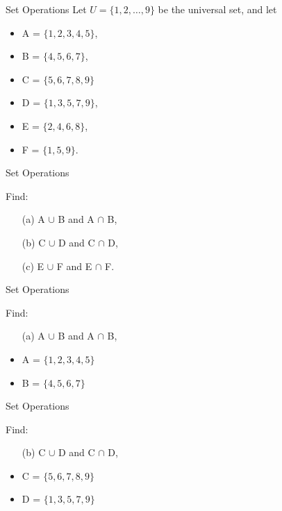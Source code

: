 \documentclass[11pt,a4paper,titlepage,oneside,openany]{article}
\numberwithin{equation}{section}
\numberwithin{algorithm}{section}
\numberwithin{figure}{section}
\numberwithin{table}{section}
\begin{document}
{%
\newpage



{Set Operations}
Let $U = \{1,2,\ldots, 9\}$ be the universal set, and let
\begin{itemize}
\item A = $\{1, 2, 3, 4, 5\}$,  
\item B = $\{4, 5, 6, 7\}$,  
\item C = $\{5, 6, 7, 8, 9\}$
\item D = $\{1, 3, 5, 7, 9\}$,
\item E = $\{2, 4, 6, 8\}$,
\item F = $\{1, 5, 9\}$.
\end{itemize}


{Set Operations}

Find: 
\begin{itemize}
\item[(a)] A $\cup$ B and A $\cap$ B, 
\item[(b)] C $\cup$ D and C $\cap$ D, 
\item[(c)] E $\cup$ F and E $\cap$ F.
\end{itemize}



{Set Operations}

Find: 
\begin{itemize}
\item[(a)] A $\cup$ B and A $\cap$ B, \bigskip
\item A = $\{1, 2, 3, 4, 5\}$  
\item B = $\{4, 5, 6, 7\}$  
\end{itemize}



{Set Operations}

Find: 
\begin{itemize}
\item[(b)] C $\cup$ D and C $\cap$ D,  \bigskip
\item C = $\{5, 6, 7, 8, 9\}$
\item D = $\{1, 3, 5, 7, 9\}$
\end{itemize}


}
\end{document}
